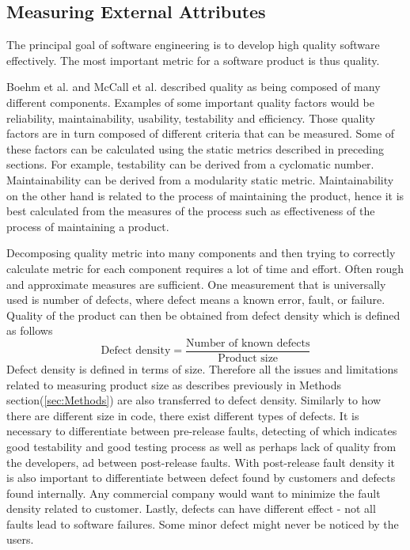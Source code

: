 \documentclass[11pt]{article}
\begin{document}
\subsection{Measuring External Attributes}
The principal goal of software engineering is to develop high quality software effectively. The most important metric for a software product is thus quality. 
\par 
Boehm et al. and McCall et al. described quality as being composed of many different components. Examples of some important quality factors would be reliability, maintainability, usability, testability and efficiency. Those quality factors are in turn composed of different criteria that can be measured. Some of these factors can be calculated using the static metrics described in preceding sections. For example, testability can be derived from a cyclomatic number. Maintainability can be derived from a modularity static metric. Maintainability on the other hand is related to the process of maintaining the product, hence it is best calculated from the measures of the process such as effectiveness of the process of maintaining a product.
\par 
Decomposing quality metric into many components and then trying to correctly calculate metric for each component requires a lot of time and effort. Often rough and approximate measures are sufficient. One measurement that is universally used is number of defects, where defect means a known error, fault, or failure. Quality of the product can then be obtained from defect density which is defined as follows \[\text{Defect density}=\frac{\text{Number of known defects}}{\text{Product size}}\]
Defect density is defined in terms of size. Therefore all the issues and limitations related to measuring product size as describes previously in Methods section(\ref*{sec:Methods}) are also transferred to defect density. Similarly to how there are different size in code, there exist  different types of defects. It is necessary to differentiate between pre-release faults, detecting of which indicates good testability and good testing process as well as perhaps lack of quality from the developers, ad between post-release faults. With post-release fault density it is also important to differentiate between defect found by customers and defects found internally. Any commercial company would want to minimize the fault density related to customer. Lastly, defects can have different effect - not all faults lead to software failures. Some minor defect might never be noticed by the users.
\end{document}
